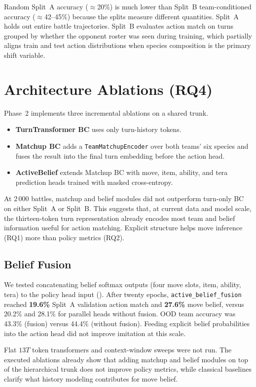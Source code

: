 Random Split~A accuracy ($\approx$20\%) is much lower than Split~B team-conditioned
accuracy ($\approx$42--45\%) because the splits measure different quantities.
Split~A holds out entire battle trajectories. Split~B evaluates action match on
turns grouped by whether the opponent roster was seen during training, which
partially aligns train and test action distributions when species composition is
the primary shift variable.

\section{Architecture Ablations (RQ4)}

Phase~2 implements three incremental ablations on a shared trunk.
\begin{itemize}
  \item \textbf{TurnTransformer BC} uses only turn-history tokens.
  \item \textbf{Matchup BC} adds a \texttt{TeamMatchupEncoder} over both teams'
    six species and fuses the result into the final turn embedding before the
    action head.
  \item \textbf{ActiveBelief} extends Matchup BC with move, item, ability, and
    tera prediction heads trained with masked cross-entropy.
\end{itemize}

At 2\,000 battles, matchup and belief modules did not outperform turn-only BC on
either Split~A or Split~B. This suggests that, at current data and model scale,
the thirteen-token turn representation already encodes most team and belief
information useful for action matching. Explicit structure helps move inference
(RQ1) more than policy metrics (RQ2).

\subsection{Belief Fusion}

We tested concatenating belief softmax outputs (four move slots, item, ability,
tera) to the policy head input (). After twenty epochs,
\texttt{active\_belief\_fusion} reached \textbf{19.6\%} Split~A validation action
match and \textbf{27.6\%} move belief, versus 20.2\% and 28.1\% for parallel
heads without fusion. OOD team accuracy was 43.3\% (fusion) versus 44.4\%
(without fusion). Feeding explicit belief probabilities into the action head did
not improve imitation at this scale.

Flat $13T$ token transformers and context-window sweeps were not run. The
executed ablations already show that adding matchup and belief modules on top of
the hierarchical trunk does not improve policy metrics, while classical
baselines clarify what history modeling contributes for move belief.

